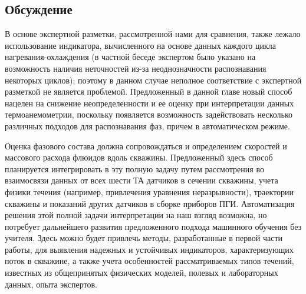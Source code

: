 \subsection{Обсуждение}
\par
В основе экспертной разметки, рассмотренной нами для сравнения, также лежало использование индикатора, вычисленного на основе данных каждого цикла нагревания-охлаждения (в частной беседе экспертом было указано на возможность наличия неточностей из-за неоднозначности распознавания некоторых циклов); поэтому в данном случае неполное соответствие с экспертной разметкой не является проблемой. Предложенный в данной главе новый способ нацелен на снижение неопределенности и ее оценку при интерпретации данных термоанемометрии, поскольку появляется возможность задействовать несколько различных подходов для распознавания фаз, причем в автоматическом режиме. 
\par
Оценка фазового состава должна сопровождаться и определением скоростей и массового расхода флюидов вдоль скважины. Предложенный здесь способ планируется интегрировать в эту полную задачу путем рассмотрения во взаимосвязи данных от всех шести ТА датчиков в сечении скважины, учета физики течения (например, привлечения уравнения неразрывности), траектории скважины и показаний других датчиков в сборке приборов ПГИ. Автоматизация решения этой полной задачи интерпретации на наш взгляд возможна, но потребует дальнейшего развития предложенного подхода машинного обучения без учителя. Здесь можно будет привлечь методы, разработанные в первой части работы, для выявления надежных и устойчивых индикаторов, характеризующих поток в скважине, а также учета особенностей рассматриваемых типов течений, известных из общепринятых физических моделей, полевых и лабораторных данных, опыта экспертов.
